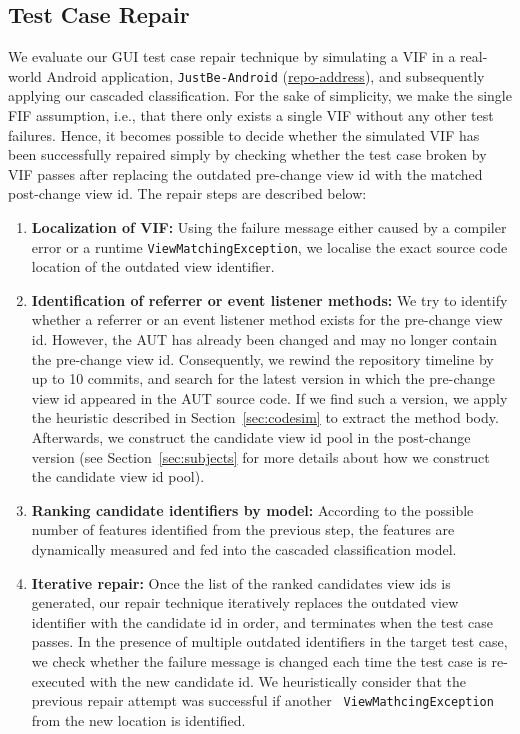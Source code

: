 \documentclass[sigconf]{acmart}
\begin{document}
\subsection{Test Case Repair}
\label{sec:repair}

We evaluate our GUI test case repair technique by simulating a VIF in a 
real-world Android application, \texttt{JustBe-Android} (\url{repo-address}), 
and subsequently applying our cascaded classification. For the sake of 
simplicity, we make the single FIF assumption, i.e., that there only exists a 
single VIF without any other test failures. Hence, it becomes possible to 
decide whether the simulated VIF has been successfully repaired simply by 
checking whether the test case broken by VIF passes after replacing the 
outdated pre-change view id with the matched post-change view id. The repair 
steps are described below:

\begin{enumerate}
\item \textbf{Localization of VIF:} Using the failure message either caused by 
a compiler error or a runtime \texttt{ViewMatchingException}, we localise the 
exact source code location of the outdated view identifier.

\item \textbf{Identification of referrer or event listener methods:} We try 
to identify whether a referrer or an event listener method exists for the 
pre-change view id. However, the AUT has already been changed and may no 
longer contain the pre-change view id. Consequently, we rewind the 
repository timeline by up to 10 commits, and search for the latest version 
in which the pre-change view id appeared in the AUT source code. If we find 
such a version, we apply the heuristic described in Section~\ref{sec:codesim}
to extract the method body. Afterwards, we construct the candidate view id 
pool in the post-change version (see Section~\ref{sec:subjects} for more 
details about how we construct the candidate view id pool).
  
\item \textbf{Ranking candidate identifiers by model:} According to the 
possible number of features identified from the previous step, the features 
are dynamically measured and fed into the cascaded classification model. 

\item \textbf{Iterative repair:} Once the list of the ranked candidates view 
ids is generated, our repair technique iteratively replaces the 
outdated view identifier with the candidate id in order, and terminates when 
the test case passes. In the presence of multiple outdated identifiers in the 
target test case, we check whether the failure message is changed each time 
the test case is re-executed with the new candidate id. We heuristically 
consider that the previous repair attempt was successful if another \texttt{
ViewMathcingException} from the new location is identified.
\end{enumerate}
\end{document}
